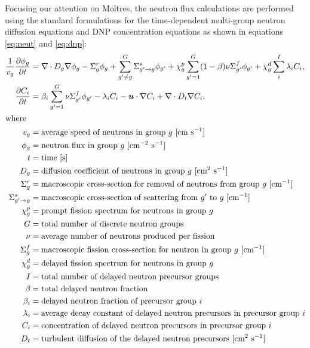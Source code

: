 Focusing our attention on Moltres, the neutron flux calculations are
performed using the standard formulations for the time-dependent multi-group
neutron diffusion equations and \gls{DNP} concentration equations as shown in
equations \ref{eq:neut} and \ref{eq:dnp}:
%
\begin{align}
    \frac{1}{v_g} \frac{\partial \phi_g}{\partial t} &= \nabla \cdot D_g
    \nabla \phi_g - \Sigma^r_g \phi_g +
    \sum^G_{g' \neq g} \Sigma^s_{g' \rightarrow g} \phi_{g'} + \chi^p_g
    \sum^G_{g'=1} (1-\beta) \nu \Sigma^f_{g'} \phi_{g'} + \chi^d_g \sum^I_i
    \lambda_i C_i, \label{eq:neut} \\
    \frac{\partial C_i}{\partial t} &= \beta_i \sum^G_{g'=1} \nu \Sigma^f_{g'}
    \phi_{g'} - \lambda_i C_i - \boldsymbol{u} \cdot \nabla C_i + \nabla \cdot
    D_t \nabla C_i, \label{eq:dnp} \\
    \intertext{where}
    v_g &= \text{average speed of neutrons in group $g$ [cm s$^{-1}$]} 
    \nonumber \\
    \phi_g &= \text{neutron flux in group $g$ [cm$^{-2}$ s$^{-1}$]} \nonumber
    \\
    t &= \text{time [s]} \nonumber \\
    D_g &= \text{diffusion coefficient of neutrons in group $g$ [cm$^2$
    s$^{-1}$]} \nonumber \\
    \Sigma^r_g &= \text{macroscopic cross-section for removal of neutrons from
    group $g$ [cm$^{-1}$]} \nonumber \\
    \Sigma^s_{g' \rightarrow g} &= \text{macroscopic cross-section of
    scattering from $g'$ to $g$ [cm$^{-1}$]} \nonumber \\
    \chi^p_g &= \text{prompt fission spectrum for neutrons in group $g$}
    \nonumber \\
    G &= \text{total number of discrete neutron groups} \nonumber \\
    \nu &= \text{average number of neutrons produced per fission} \nonumber \\
    \Sigma^f_{g} &= \text{macroscopic fission cross-section for neutron in
    group $g$ [cm$^{-1}$]} \nonumber \\
    \chi^d_g &= \text{delayed fission spectrum for neutrons in group }g
    \nonumber \\
    I &= \text{total number of delayed neutron precursor groups} \nonumber \\
    \beta &= \text{total delayed neutron fraction} \nonumber \\
    \beta_i &= \text{delayed neutron fraction of precursor group $i$}
    \nonumber \\
    \lambda_i &= \text{average decay constant of delayed neutron precursors in
    precursor group $i$} \nonumber \\
    C_i &= \text{concentration of delayed neutron precursors in precursor
    group $i$} \nonumber \\
    D_t &= \text{turbulent diffusion of the delayed neutron precursors [cm$^2$
    s$^{-1}$]} \nonumber
\end{align}
%

